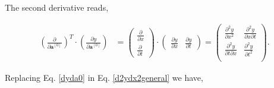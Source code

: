 \documentclass{article}
\begin{document}
The second derivative reads,

\begin{align}
\label{d2ydx2general}
\left(\frac{\partial}{\partial \textbf{a}^{[0]}}\right)^T \cdot \left(\frac{\partial y}{\partial \textbf{a}^{[0]}}\right)  &= \begin{pmatrix}
\frac{\partial }{\partial x}  \\
\frac{\partial }{\partial t} 
\end{pmatrix} \cdot\begin{pmatrix}
\frac{\partial y}{\partial x}  &
\frac{\partial y}{\partial t} 
\end{pmatrix} = 
\begin{pmatrix}
\frac{\partial^2 y}{\partial x^2}  & \frac{\partial^2 y}{\partial x \partial t} \\
\frac{\partial^2 y}{\partial t \partial x} & \frac{\partial^2 y}{\partial t^2} \\
\end{pmatrix}.
\end{align}

Replacing Eq. \eqref{dyda0} in Eq. \eqref{d2ydx2general} we have,
\end{document}
